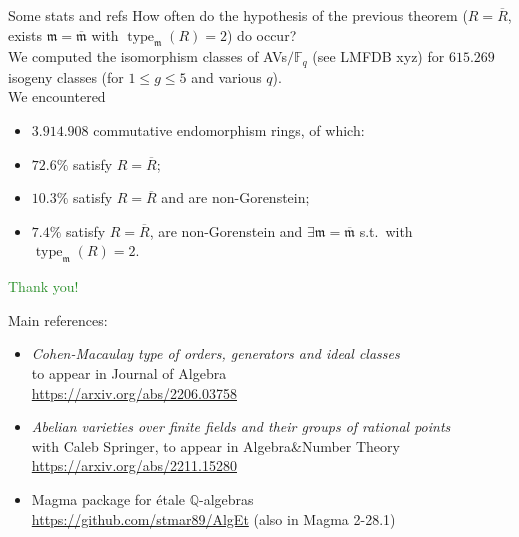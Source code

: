 \documentclass[usenames,dvipsnames]{beamer}
\def\Q{\mathbb{Q}}
\def\F{\mathbb{F}}
\DeclareMathOperator{\type}{type}
\renewcommand{\frm}{{\mathfrak m}}
\newcommand{\green}[1]{\textcolor{ForestGreen}{#1}}
\begin{document}
\begin{frame}{ Some stats and refs }
    How often do the hypothesis of the previous theorem ($R=\overline R$, exists $\frm =\overline \frm$ with $\type_\frm(R)=2$) do occur?\\

    We computed the isomorphism classes of AVs$/\F_q$ (see LMFDB xyz) for $615.269$ isogeny classes (for $1\leq g \leq 5$ and various $q$).\\
    We encountered
    \begin{itemize}
        \item $3.914.908$ commutative endomorphism rings, of which:
        \item \pause $72.6 \%$ satisfy $R=\overline{R}$;
        \item \pause $10.3 \%$ satisfy $R=\overline{R}$ and are non-Gorenstein;
        \item \pause $7.4 \%$ satisfy $R=\overline{R}$, are non-Gorenstein and $\exists \frm=\overline \frm$ s.t.~with $\type_\frm(R)=2$.
	\end{itemize}
\end{frame}

\begin{frame}{  }
    \begin{center}
    \green{\huge Thank you!}
    \end{center}
    {\footnotesize Main references:
    \begin{itemize}
        \item \emph{Cohen-Macaulay type of orders, generators and ideal classes}\\ to appear in Journal of Algebra\\
            \url{https://arxiv.org/abs/2206.03758}
        \item \emph{Abelian varieties over finite fields and their groups of rational points}\\
            with Caleb Springer, to appear in Algebra\&Number Theory\\
            \url{https://arxiv.org/abs/2211.15280}
        \item Magma package for \'etale $\Q$-algebras\\
            \url{https://github.com/stmar89/AlgEt} 
            (also in Magma 2-28.1)
    \end{itemize}
    }
\end{frame}

	
\end{document}
